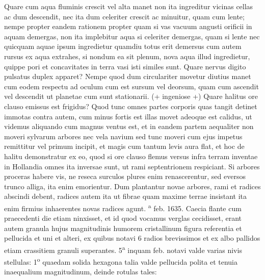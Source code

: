 \pend%
\pstart%
Quare cum aqua fluminis crescit vel alta manet non ita ingreditur vicinas cellas ac dum descendit, nec ita dum celeriter crescit ac minuitur, quam cum lente; nempe propter eandem rationem propter quam si vas vacuum angusti orificii in aquam demergas, non ita implebitur aqua si celeriter demergas, quam si lente nec quicquam aquae ipsum ingredietur quamdiu totus erit demersus cum autem rursus ex aqua extrahes, si nondum ea sit plenum, nova aqua illud ingredietur, quippe pori et concavitates in terra vasi isti similes sunt.
\pend%
\pstart%
Quare nervus digito pulsatus duplex apparet? Nempe quod dum circulariter movetur diutius manet cum eodem respectu ad oculum cum est sursum vel deorsum, quam cum ascendit vel descendit ut planetae cum sunt stationarii. (+ ingeniose +)
\pend%
\pstart%
Quare halitus ore clauso emissus est frigidus?
Quod tunc omnes partes corporis quas tangit
detinet immotas contra autem, cum minus fortis est illas movet adeoque est calidus, ut videmus aliquando cum magnus ventus est, et in eandem partem aequaliter 
non moveri sylvarum arbores nec vela navium sed tunc moveri cum ejus impetus remittitur vel primum incipit, et magis cum tantum levis aura flat, et hoc de halitu demonstratur ex eo, quod si ore clauso flemus versus
%
{}
\pend%
\pstart%
infra terram inventae in Hollandia omnes ita inversae sunt, ut rami septentrionem respiciant. Si arbores proceras habere vis, ne reseca surculos plures enim renascerentur, sed eversos trunco alliga, ita enim emorientur.
\pend%
\pstart%
Dum plantantur novae arbores, rami et radices abscindi debent, radices autem ita ut fibrae quam maxime terrae insistant ita enim firmius inhaerentes novas radices agunt. 
\pend%
\newpage
{}\textsuperscript{a} feb. 1635.
Caecia flante cum praecedenti die etiam ninxisset, et id quod vocamus verglas cecidisset, erant autem granula hujus magnitudinis humorem cristallinum figura referentia et pellucida et uni et alteri, ex quibus notavi 6 radios brevissimos et ex albo pallidos etiam crassitiem granuli superantes. 5\textsuperscript{a} inquam feb. notavi valde varias nivis stellulas: 1\textsuperscript{o} quaedam solida hexagona talia valde pellucida polita et tenuia inaequalium magnitudinum, deinde rotulas tales: 
